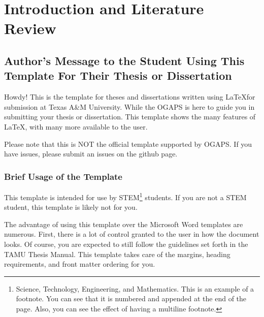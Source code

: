 

\chapter[Put citation here if part of this work is already published]{Introduction and Literature Review}

\section{Author's Message to the Student Using This Template For Their Thesis or Dissertation}

Howdy! This is the template for theses and dissertations written using \LaTeX for submission at Texas A\&M University. While the \ac{OGAPS} is here to guide you in submitting your thesis or dissertation. This template shows the many features of \LaTeX, with many more available to the user.

Please note that this is NOT the official template supported by \ac{OGAPS}. If you have issues, please submit an issues on the github page.


\subsection{Brief Usage of the Template}

This template is intended for use by STEM\footnote{Science, Technology, Engineering, and Mathematics. This is an example of a footnote. You can see that it is numbered and appended at the end of the page. Also, you can see the effect of having a multiline footnote.} students. If you are not a STEM student, this template is likely not for you.

The advantage of using this template over the Microsoft Word templates are numerous. First, there is a lot of control granted to the user in how the document looks. Of course, you are expected to still follow the guidelines set forth in the TAMU Thesis Manual. This template takes care of the margins, heading requirements, and front matter ordering for you.


